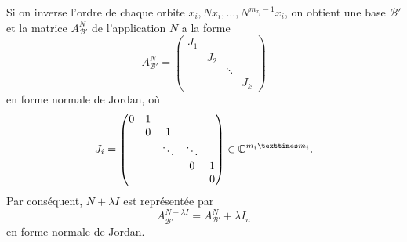 \begin{remark}
  \label{rem:4}
  Si on inverse l'ordre de chaque orbite $x_i, Nx_i, \dots, N^{m_{x_i}-1} x_i$,
  on obtient une base $ℬ'$ et la matrice $A_{ℬ'}^{N }$ de l'application $N$  a la forme 
  \begin{displaymath}
    A_{ℬ'}^N =
    \begin{pmatrix}
      J_1 \\
      & J_2 \\
      & & \ddots \\
      & & & J_k
    \end{pmatrix}
  \end{displaymath}
en forme normale de Jordan, où 
\begin{displaymath}
  J_i =
  \begin{pmatrix}
    0 & 1 \\
    &  0 & 1 \\
    &    & \ddots & \ddots \\
    &    &        & 0 & 1 \\
    & & & & 0
  \end{pmatrix} \in \C^{m_i × m_i}. 
\end{displaymath}
Par conséquent, $N+ λI$ est représentée par 
\begin{displaymath}
 A_{ℬ'}^{N + λI} =    A_{ℬ'}^N + λ I_n
\end{displaymath}
en forme normale de Jordan. 
\end{remark}


